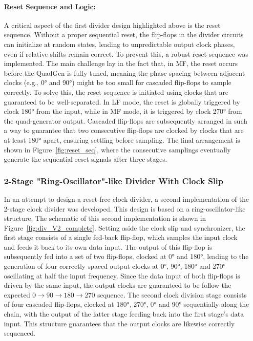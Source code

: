 \paragraph{Reset Sequence and Logic:}
A critical aspect of the first divider design highlighted above is the reset sequence. Without a proper sequential reset, the flip-flops in the divider circuits can initialize at random states, leading to unpredictable output clock phases, even if relative shifts remain correct. To prevent this, a robust reset sequence was implemented.
The main challenge lay in the fact that, in MF, the reset occurs before the QuadGen is fully tuned, meaning the phase spacing between adjacent clocks (e.g., \ang{0} and \ang{90}) might be too small for cascaded flip-flops to sample correctly. To solve this, the reset sequence is initiated using clocks that are guaranteed to be well-separated. 
In LF mode, the reset is globally triggered by clock \ang{180} from the input, while in MF mode, it is triggered by clock \ang{270} from the quad-generator output. 
Cascaded flip-flops are subsequently arranged in such a way to guarantee that two consecutive flip-flops are clocked by clocks that are at least \ang{180} apart, ensuring settling before sampling. The final arrangement is shown in Figure~\ref{fig:reset_seq}, where the consecutive samplings eventually generate the sequential reset signals after three stages.

\subsubsection{2-Stage "Ring-Oscillator"-like Divider With Clock Slip}
In an attempt to design a reset-free clock divider, a second implementation of the 2-stage clock divider was developed. This design is based on a ring-oscillator-like structure. The schematic of this second implementation is shown in Figure~\ref{fig:div_V2_complete}. 
Setting aside the clock slip and synchronizer, the first stage consists of a single fed-back flip-flop, which samples the input clock and feeds it back to its own data input. The output of this flip-flop is subsequently fed into a set of two flip-flops, clocked at \ang{0} and \ang{180}, leading to the generation of four correctly-spaced output clocks at \ang{0}, \ang{90}, \ang{180} and \ang{270} oscillating at half the input frequency. 
Since the data input of both flip-flops is driven by the same input, the output clocks are guaranteed to be follow the expected \(0\rightarrow 90\rightarrow 180\rightarrow 270\) sequence.
The second clock division stage consists of four cascaded flip-flops, clocked at \ang{180}, \ang{270}, \ang{0} and \ang{90} sequentially along the chain, with the output of the latter stage feeding back into the first stage's data input. This structure guarantees that the output clocks are likewise correctly sequenced.
